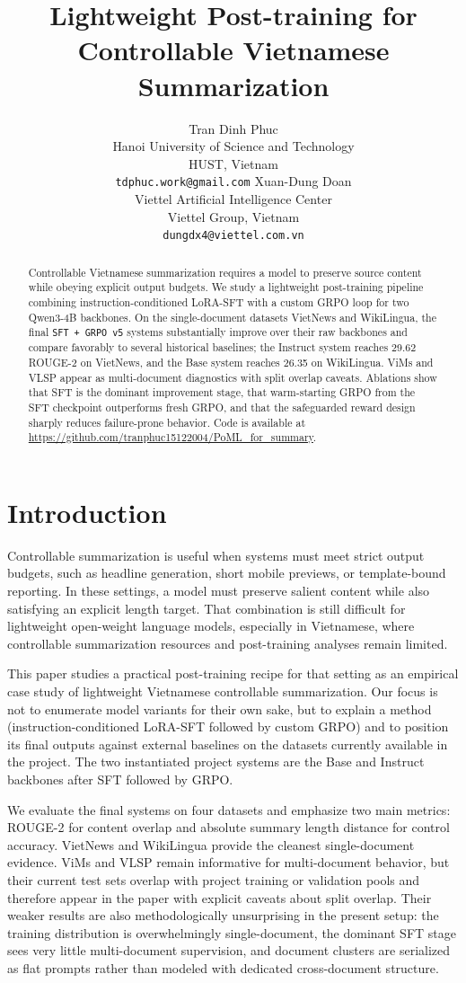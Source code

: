 \documentclass[11pt]{article}
\title{Lightweight Post-training for Controllable Vietnamese Summarization}
\author{Tran Dinh Phuc \\
  Hanoi University of Science and Technology \\
  HUST, Vietnam \\
  \texttt{tdphuc.work@gmail.com}
  \And
  Xuan-Dung Doan \\
  Viettel Artificial Intelligence Center \\
  Viettel Group, Vietnam \\
  \texttt{dungdx4@viettel.com.vn}}
\begin{document}
\maketitle

\begin{abstract}
Controllable Vietnamese summarization requires a model to preserve source content while obeying explicit output budgets.
We study a lightweight post-training pipeline combining instruction-conditioned LoRA-SFT with a custom GRPO loop for two Qwen3-4B backbones.
On the single-document datasets VietNews and WikiLingua, the final \texttt{SFT + GRPO v5} systems substantially improve over their raw backbones and compare favorably to several historical baselines; the Instruct system reaches 29.62 ROUGE-2 on VietNews, and the Base system reaches 26.35 on WikiLingua.
ViMs and VLSP appear as multi-document diagnostics with split overlap caveats.
Ablations show that SFT is the dominant improvement stage, that warm-starting GRPO from the SFT checkpoint outperforms fresh GRPO, and that the safeguarded reward design sharply reduces failure-prone behavior. Code is available at \url{https://github.com/tranphuc15122004/PoML_for_summary}.
\end{abstract}

\section{Introduction}
Controllable summarization is useful when systems must meet strict output budgets, such as headline generation, short mobile previews, or template-bound reporting.
In these settings, a model must preserve salient content while also satisfying an explicit length target.
That combination is still difficult for lightweight open-weight language models, especially in Vietnamese, where controllable summarization resources and post-training analyses remain limited.

This paper studies a practical post-training recipe for that setting as an empirical case study of lightweight Vietnamese controllable summarization.
Our focus is not to enumerate model variants for their own sake, but to explain a method (instruction-conditioned LoRA-SFT followed by custom GRPO) and to position its final outputs against external baselines on the datasets currently available in the project.
The two instantiated project systems are the Base and Instruct backbones after SFT followed by GRPO.

We evaluate the final systems on four datasets and emphasize two main metrics: ROUGE-2 for content overlap and absolute summary length distance for control accuracy.
VietNews and WikiLingua provide the cleanest single-document evidence.
ViMs and VLSP remain informative for multi-document behavior, but their current test sets overlap with project training or validation pools and therefore appear in the paper with explicit caveats about split overlap. Their weaker results are also methodologically unsurprising in the present setup: the training distribution is overwhelmingly single-document, the dominant SFT stage sees very little multi-document supervision, and document clusters are serialized as flat prompts rather than modeled with dedicated cross-document structure.
\end{document}
